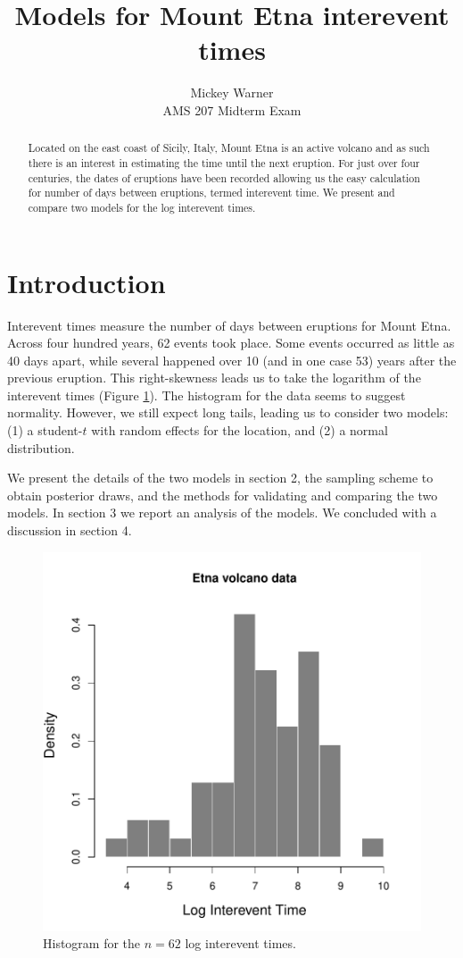 \documentclass{asaproc}
\title{Models for Mount Etna interevent times}
\author{Mickey Warner \\ AMS 207 Midterm Exam}
\begin{document}
\maketitle


\begin{abstract}
Located on the east coast of Sicily, Italy, Mount Etna is an active volcano and as such there is an interest in estimating the time until the next eruption. For just over four centuries, the dates of eruptions have been recorded allowing us the easy calculation for number of days between eruptions, termed interevent time. We present and compare two models for the log interevent times.
\end{abstract}

\section{Introduction}
Interevent times measure the number of days between eruptions for Mount Etna. Across four hundred years, 62 events took place. Some events occurred as little as 40 days apart, while several happened over 10 (and in one case 53) years after the previous eruption. This right-skewness leads us to take the logarithm of the interevent times (Figure \ref{data}). The histogram for the data seems to suggest normality. However, we still expect long tails, leading us to consider two models: (1) a student-$t$ with random effects for the location, and (2) a normal distribution.

We present the details of the two models in section 2, the sampling scheme to obtain posterior draws, and the methods for validating and comparing the two models. In section 3 we report an analysis of the models. We concluded with a discussion in section 4.
\begin{figure}[ht]
\centering
\includegraphics[scale=0.55]{figs/data.pdf}
\caption{Histogram for the $n=62$ log interevent times.}
\label{data}
\end{figure}
\end{document}
